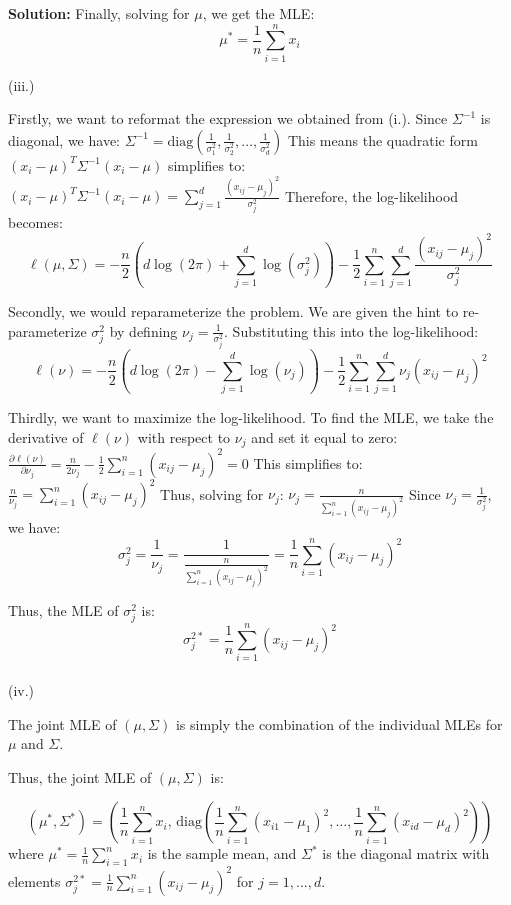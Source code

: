 \documentclass{article}
\newenvironment{solution}{\color{blue} \smallskip \textbf{Solution:}}{}
\begin{document}
\begin{enumerate}[(a)]
\begin{solution}
Finally, solving for \( \mu \), we get the MLE:
\[
\boxed{ \mu^* = \frac{1}{n} \sum_{i=1}^{n} x_i }
\]

(iii.)

Firstly, we want to reformat the expression we obtained from (i.). Since \( \Sigma^{-1} \) is diagonal, we have: 
\(
\Sigma^{-1} = \text{diag}\left( \frac{1}{\sigma_1^2}, \frac{1}{\sigma_2^2}, \dots, \frac{1}{\sigma_d^2} \right)
\)
This means the quadratic form \( (x_i - \mu)^T \Sigma^{-1} (x_i - \mu) \) simplifies to:
\(
(x_i - \mu)^T \Sigma^{-1} (x_i - \mu) = \sum_{j=1}^{d} \frac{(x_{ij} - \mu_j)^2}{\sigma_j^2}
\)
Therefore, the log-likelihood becomes:
\[
\ell(\mu, \Sigma) = -\frac{n}{2} \left( d \log(2\pi) + \sum_{j=1}^{d} \log(\sigma_j^2) \right) - \frac{1}{2} \sum_{i=1}^{n} \sum_{j=1}^{d} \frac{(x_{ij} - \mu_j)^2}{\sigma_j^2}
\]

Secondly, we would reparameterize the problem. We are given the hint to re-parameterize \( \sigma_j^2 \) by defining \( \nu_j = \frac{1}{\sigma_j^2} \). Substituting this into the log-likelihood:
\[
\ell(\nu) = -\frac{n}{2} \left( d \log(2\pi) - \sum_{j=1}^{d} \log(\nu_j) \right) - \frac{1}{2} \sum_{i=1}^{n} \sum_{j=1}^{d} \nu_j (x_{ij} - \mu_j)^2
\]

Thirdly, we want to maximize the log-likelihood. To find the MLE, we take the derivative of \( \ell(\nu) \) with respect to \( \nu_j \) and set it equal to zero:
\(
\frac{\partial \ell(\nu)}{\partial \nu_j} = \frac{n}{2 \nu_j} - \frac{1}{2} \sum_{i=1}^{n} (x_{ij} - \mu_j)^2 = 0
\)
This simplifies to:
\(
\frac{n}{\nu_j} = \sum_{i=1}^{n} (x_{ij} - \mu_j)^2
\)
Thus, solving for \( \nu_j \):
\(
\nu_j = \frac{n}{\sum_{i=1}^{n} (x_{ij} - \mu_j)^2}
\)
Since \( \nu_j = \frac{1}{\sigma_j^2} \), we have:
\[
\sigma_j^2 = \frac{1}{\nu_j} = \frac{1}{\frac{n}{\sum_{i=1}^{n} (x_{ij} - \mu_j)^2}} = \frac{1}{n} \sum_{i=1}^{n} (x_{ij} - \mu_j)^2
\]

Thus, the MLE of \( \sigma_j^2 \) is:
\[
\boxed{ \sigma_j^{2*} = \frac{1}{n} \sum_{i=1}^{n} (x_{ij} - \mu_j)^2 }
\]\\

(iv.)


The joint MLE of \( (\mu, \Sigma) \) is simply the combination of the individual MLEs for \( \mu \) and \( \Sigma \).

Thus, the joint MLE of \( (\mu, \Sigma) \) is:

\[
\boxed{
(\mu^*, \Sigma^*) = \left( \frac{1}{n} \sum_{i=1}^{n} x_i, \, \text{diag}\left( \frac{1}{n} \sum_{i=1}^{n} (x_{i1} - \mu_1)^2, \dots, \frac{1}{n} \sum_{i=1}^{n} (x_{id} - \mu_d)^2 \right) \right)
}
\]
where \( \mu^* = \frac{1}{n} \sum_{i=1}^{n} x_i \) is the sample mean, and \( \Sigma^* \) is the diagonal matrix with elements \( \sigma_j^{2*} = \frac{1}{n} \sum_{i=1}^{n} (x_{ij} - \mu_j)^2 \) for \( j = 1, \dots, d \).





\end{solution}
\end{enumerate}
\end{document}
